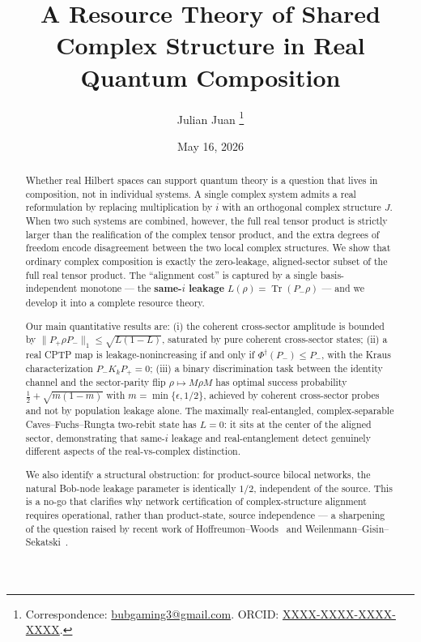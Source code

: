 \documentclass[a4paper,onecolumn,noarxiv]{quantumarticle}
\title{A Resource Theory of Shared Complex Structure in Real Quantum Composition}
\author{Julian Juan%
  \thanks{Correspondence: \href{mailto:bubgaming3@gmail.com}{bubgaming3@gmail.com}. ORCID: \href{https://orcid.org/XXXX-XXXX-XXXX-XXXX}{XXXX-XXXX-XXXX-XXXX}.}}
\affiliation{Independent researcher}
\date{May 16, 2026}
\theoremstyle{plain}
\theoremstyle{definition}
\theoremstyle{remark}
\newcommand{\Pplus}{P_{+}}
\newcommand{\Pminus}{P_{-}}
\newcommand{\Mop}{M}
\newcommand{\Tr}{\operatorname{Tr}}
\newcommand{\Phid}{\Phi^{\dagger}}
\newcommand{\Lleak}{L}
\begin{document}
\maketitle

\begin{abstract}
Whether real Hilbert spaces can support quantum theory is a question that lives in
composition, not in individual systems. A single complex system admits a real
reformulation by replacing multiplication by $i$ with an orthogonal complex structure
$J$. When two such systems are combined, however, the full real tensor product is
strictly larger than the realification of the complex tensor product, and the extra
degrees of freedom encode disagreement between the two local complex structures. We
show that ordinary complex composition is exactly the zero-leakage, aligned-sector
subset of the full real tensor product. The ``alignment cost'' is captured by a single
basis-independent monotone --- the \textbf{same-$i$ leakage} $\Lleak(\rho) =
\Tr(\Pminus\rho)$ --- and we develop it into a complete resource theory.

Our main quantitative results are: (i) the coherent cross-sector amplitude is bounded
by $\|\Pplus\rho\Pminus\|_1 \le \sqrt{\Lleak(1-\Lleak)}$, saturated by pure coherent
cross-sector states; (ii) a real CPTP map is leakage-nonincreasing if and only if
$\Phid(\Pminus)\le\Pminus$, with the Kraus characterization $\Pminus K_k\Pplus=0$;
(iii) a binary discrimination task between the identity channel and the sector-parity
flip $\rho\mapsto\Mop\rho\Mop$ has optimal success probability $\tfrac{1}{2} +
\sqrt{m(1-m)}$ with $m=\min\{\epsilon,1/2\}$, achieved by coherent cross-sector
probes and not by population leakage alone. The maximally real-entangled,
complex-separable Caves--Fuchs--Rungta two-rebit state has $\Lleak=0$: it sits at
the center of the aligned sector, demonstrating that same-$i$ leakage and
real-entanglement detect genuinely different aspects of the real-vs-complex
distinction.

We also identify a structural obstruction: for product-source bilocal networks, the
natural Bob-node leakage parameter is identically $1/2$, independent of the source.
This is a no-go that clarifies why network certification of complex-structure
alignment requires operational, rather than product-state, source independence ---
a sharpening of the question raised by recent work of Hoffreumon--Woods~%
\cite{HoffreumonWoods2025,HoffreumonWoodsNonFalsified} and Weilenmann--Gisin--%
Sekatski~\cite{WeilenmannGisinSekatski2025}.
\end{abstract}
\end{document}
